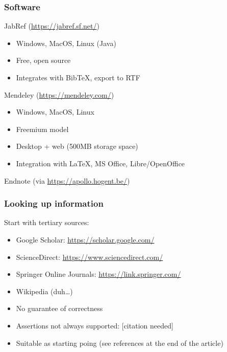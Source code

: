 \documentclass{beamer}
\begin{document}
\begin{frame}
  \frametitle{Software}

  JabRef (\url{https://jabref.sf.net/})

  \begin{itemize}
    \item Windows, MacOS, Linux (Java)
    \item Free, open source
    \item Integrates with Bib{\TeX}, export to RTF
  \end{itemize}

  \pause

  Mendeley (\url{https://mendeley.com/})

  \begin{itemize}
    \item Windows, MacOS, Linux
    \item Freemium model
    \item Desktop + web (500MB storage space)
    \item Integration with {\LaTeX}, MS Office, Libre/OpenOffice
  \end{itemize}

  \pause

  Endnote (via \url{https://apollo.hogent.be/})
\end{frame}

\begin{frame}
  \frametitle{Looking up information}

  Start with \alert{tertiary} sources:

  \begin{itemize}
    \item Google Scholar: \url{https://scholar.google.com/}
    \item ScienceDirect: \url{https://www.sciencedirect.com/}
    \item Springer Online Journals: \url{https://link.springer.com/}
    \item Wikipedia (duh\dots)
  \end{itemize}


  \pause

  \begin{itemize}
    \item No guarantee of correctness
    \item Assertions not always supported: [citation needed]
    \item Suitable as starting poing (see references at the end of the article)
  \end{itemize}
\end{frame}
\end{document}
